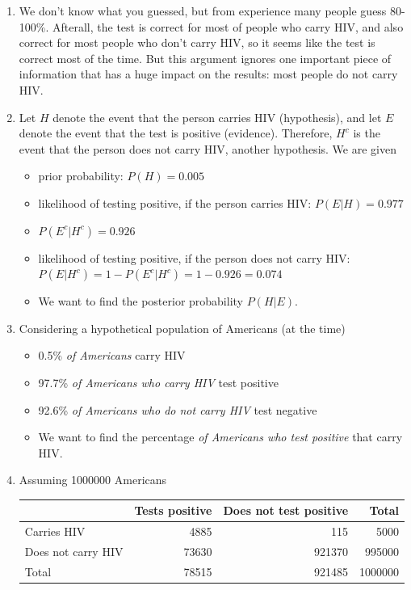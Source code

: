 \documentclass[
]{book}
\providecommand{\tightlist}{%
  \setlength{\itemsep}{0pt}\setlength{\parskip}{0pt}}
\theoremstyle{definition}
\theoremstyle{definition}
\theoremstyle{definition}
\theoremstyle{remark}
\begin{document}
\begin{enumerate}
\def\labelenumi{\arabic{enumi}.}
\item
  We don't know what you guessed, but from experience many people guess 80-100\%. Afterall, the test is correct for most of people who carry HIV, and also correct for most people who don't carry HIV, so it seems like the test is correct most of the time. But this argument ignores one important piece of information that has a huge impact on the results: most people do not carry HIV.
\item
  Let \(H\) denote the event that the person carries HIV (hypothesis), and let \(E\) denote the event that the test is positive (evidence). Therefore, \(H^c\) is the event that the person does not carry HIV, another hypothesis. We are given

  \begin{itemize}
  \tightlist
  \item
    prior probability: \(P(H) = 0.005\)
  \item
    likelihood of testing positive, if the person carries HIV: \(P(E|H) = 0.977\)
  \item
    \(P(E^c|H^c) = 0.926\)
  \item
    likelihood of testing positive, if the person does not carry HIV: \(P(E|H^c) = 1-P(E^c|H^c) = 1-0.926 = 0.074\)
  \item
    We want to find the posterior probability \(P(H|E)\).
  \end{itemize}
\item
  Considering a hypothetical population of Americans (at the time)

  \begin{itemize}
  \tightlist
  \item
    0.5\% \emph{of Americans} carry HIV
  \item
    97.7\% \emph{of Americans who carry HIV} test positive
  \item
    92.6\% \emph{of Americans who do not carry HIV} test negative
  \item
    We want to find the percentage \emph{of Americans who test positive} that carry HIV.\\
  \end{itemize}
\item
  Assuming 1000000 Americans

  \begin{longtable}[]{@{}lrrr@{}}
  \toprule
  & Tests positive & Does not test positive & Total\tabularnewline
  \midrule
  \endhead
  Carries HIV & 4885 & 115 & 5000\tabularnewline
  Does not carry HIV & 73630 & 921370 & 995000\tabularnewline
  Total & 78515 & 921485 & 1000000\tabularnewline
  \bottomrule
  \end{longtable}


\end{enumerate}
\end{document}
